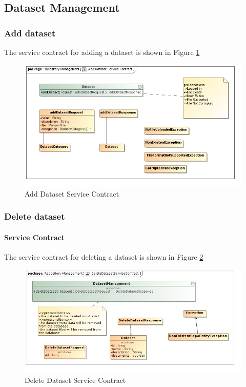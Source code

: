 \subsection{Dataset Management}

\subsubsection {Add dataset}
The service contract for adding a dataset is shown in Figure \ref{fig:addDatasetService}
\begin{figure}[H]
  \begin{center}
  \includegraphics[scale=0.6]{../Diagrams and Charts/Test Data/Add Dataset Service Contract.jpg}
  \caption{Add Dataset Service Contract}
  \label{fig:addDatasetService}
  \end{center}  
\end{figure}

\subsubsection {Delete dataset}
\paragraph{Service Contract}
The service contract for deleting a dataset is shown in Figure \ref{fig:deleteDatasetService}

\begin{figure}[H]
  \begin{center}
  \includegraphics[scale=0.5]{../Diagrams and Charts/Test Data/DeleteDatasetServiceContract.jpg}
  \caption{Delete Dataset Service Contract}
  \label{fig:deleteDatasetService}
  \end{center}  
 \end{figure}

